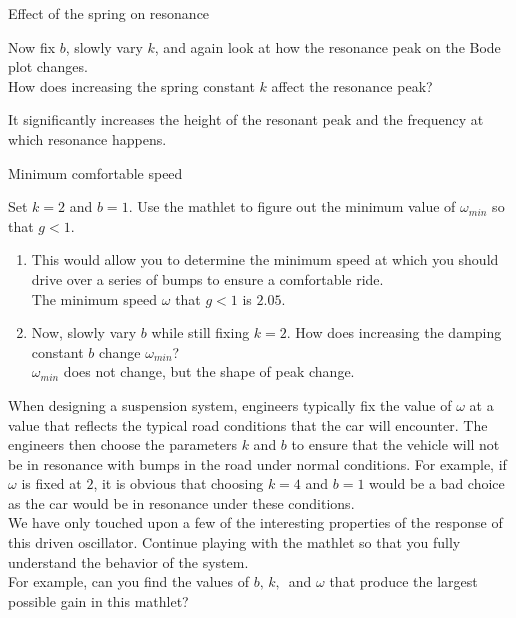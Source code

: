 \begin{problem}
  Effect of the spring on resonance
\end{problem}

Now fix $b$, slowly vary $k$, and again look at how the resonance peak on the Bode plot changes. \\
How does increasing the spring constant $k$ affect the resonance peak?

It significantly increases the height of the resonant peak and the frequency at which resonance happens.

\begin{problem}
  Minimum comfortable speed
\end{problem}

Set $k=2$ and $b=1$. Use the mathlet to figure out the minimum value of
$\omega_{min}$ so that $g<1$.
\begin{enumerate}
\item This would allow you to determine the minimum speed at which you should drive over
  a series of bumps to ensure a comfortable ride.\\

  The minimum speed $\omega$ that $g < 1$ is $2.05$.

\item Now, slowly vary $b$ while still fixing $k=2$.
  How does increasing the damping constant $b$ change $\omega_ {min}$?\\

  $\omega_ {min}$ does not change, but the shape of peak change. 
\end{enumerate}

When designing a suspension system, engineers typically fix the value of
$\omega$ at a value that reflects the typical road conditions that the car will encounter.
The engineers then choose the parameters $k$ and $b$ to ensure
that the vehicle will not be in resonance with bumps in the road under normal conditions.
For example, if $\omega$ is fixed at $2$,
it is obvious that choosing $k=4$ and $b=1$ would be a bad choice
as the car would be in resonance under these conditions.\\

We have only touched upon a few of the interesting properties of the response of this driven oscillator. Continue playing with the mathlet so that you fully understand the behavior of the system.\\

For example, can you find the values of $b,\,k,\,$ and
$\omega$ that produce the largest possible gain in this mathlet? 
\clearpage
